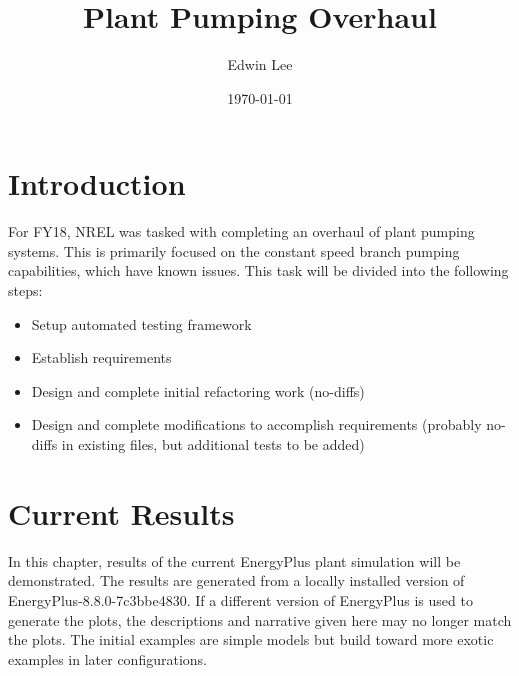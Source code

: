 \documentclass{report}
\title{Plant Pumping Overhaul}
\author{Edwin Lee}
\date{\today}
\begin{document}
  \maketitle

  \tableofcontents

  \chapter{Introduction}\label{ch:intro}

    For FY18, NREL was tasked with completing an overhaul of plant pumping systems.
    This is primarily focused on the constant speed branch pumping capabilities, which have known issues.
    This task will be divided into the following steps:

    \begin{itemize}
      \item Setup automated testing framework
      \item Establish requirements
      \item Design and complete initial refactoring work (no-diffs)
      \item Design and complete modifications to accomplish requirements (probably no-diffs in existing files, but additional tests to be added)
    \end{itemize}

  \chapter{Current Results}\label{ch:current}

    In this chapter, results of the current EnergyPlus plant simulation will be demonstrated.
    The results are generated from a locally installed version of EnergyPlus-8.8.0-7c3bbe4830.
    If a different version of EnergyPlus is used to generate the plots, the descriptions and narrative given here may no longer match the plots.
    The initial examples are simple models but build toward more exotic examples in later configurations.
\end{document}
